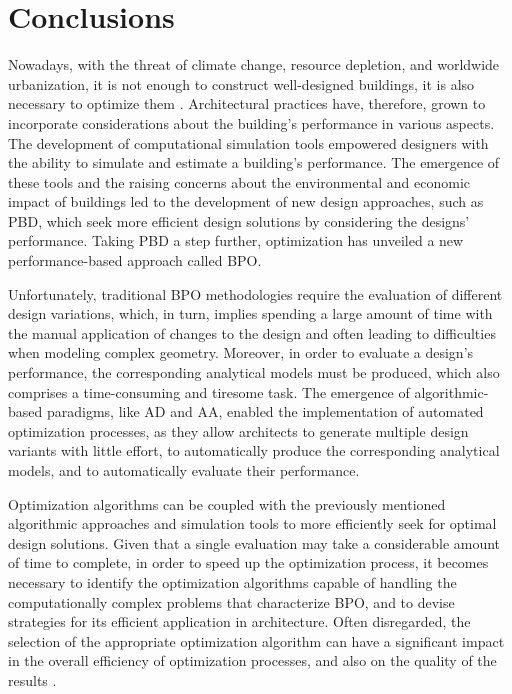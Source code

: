\section{Conclusions}
\label{sec:concl}

Nowadays, with the threat of climate change, resource depletion, and worldwide urbanization, it is not enough to construct well-designed buildings, it is also necessary to optimize them \cite{Wortmann2015AdvSBO}. Architectural practices have, therefore, grown to incorporate considerations about the building's performance in various aspects. The development of computational simulation tools empowered designers with the ability to simulate and estimate a building’s performance. The emergence of these tools and the raising concerns about the environmental and economic impact of buildings led to the development of new design approaches, such as \ac{PBD}, which seek more efficient design solutions by considering the designs’ performance. Taking \ac{PBD} a step further, optimization has unveiled a new performance-based approach called \ac{BPO}. 

Unfortunately, traditional \ac{BPO} methodologies require the evaluation of different design variations, which, in turn, implies spending a large amount of time with the manual application of changes to the design and often leading to difficulties when modeling complex geometry. Moreover, in order to evaluate a design's performance, the corresponding analytical models must be produced, which also comprises a time-consuming and tiresome task. The emergence of algorithmic-based paradigms, like \ac{AD} and \ac{AA}, enabled the implementation of automated optimization processes, as they allow architects to generate multiple design variants with little effort, to automatically produce the corresponding analytical models, and to automatically evaluate their performance. 

Optimization algorithms can be coupled with the previously mentioned algorithmic approaches and simulation tools to more efficiently seek for optimal design solutions. Given that a single evaluation may take a considerable amount of time to complete, in order to speed up the optimization process, it becomes necessary to identify the optimization algorithms capable of handling the computationally complex problems that characterize \ac{BPO}, and to devise strategies for its efficient application in architecture. Often disregarded, the selection of the appropriate optimization algorithm can have a significant impact in the overall efficiency of optimization processes, and also on the quality of the results \cite{Wolpert1997NFLT}.

